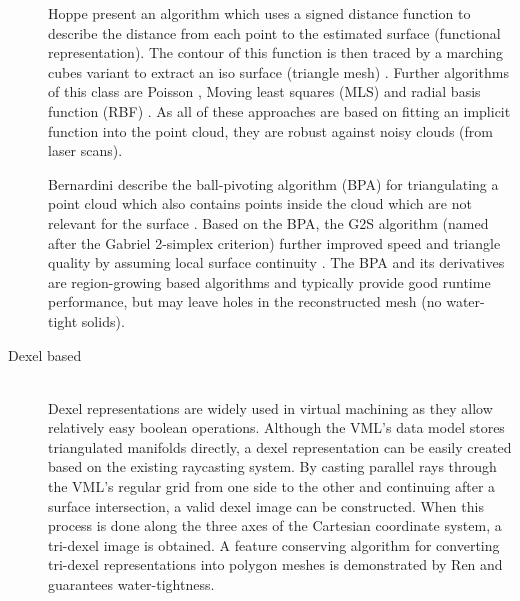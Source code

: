 \begin{description}
	Hoppe \etal present an algorithm which uses a signed distance function to describe the distance from each point to the estimated surface (functional representation).
	The contour of this function is then traced by a marching cubes variant to extract an iso surface (triangle mesh) \cite{sdf_surface_reconstruction}.
	Further algorithms of this class are Poisson \cite{poisson}, Moving least squares (MLS) \cite{mls} and radial basis function (RBF) \cite{rbf}.
	As all of these approaches are based on fitting an implicit function into the point cloud, they are robust against noisy clouds (\eg from laser scans).
	
	Bernardini \etal describe the ball-pivoting algorithm (BPA) for triangulating a point cloud which also contains points inside the cloud which are not relevant for the surface \cite{bpa}.
	Based on the BPA, the G2S algorithm (named after the Gabriel 2-simplex criterion) further improved speed and triangle quality by assuming local surface continuity \cite{g2s}.
	The BPA and its derivatives are region-growing based algorithms and typically provide good runtime performance, but may leave holes in the reconstructed mesh (no water-tight solids).
		
	\item[Dexel based] \hfill \\
	Dexel representations are widely used in virtual machining as they allow  relatively easy boolean operations.
	Although the VML's data model stores triangulated manifolds directly, a dexel representation can be easily created based on the existing raycasting system.
	By casting parallel rays through the VML's regular grid from one side to the other and continuing after a surface intersection, a valid dexel image can be constructed.
	When this process is done along the three axes of the Cartesian coordinate system, a tri-dexel image is obtained.
	A feature conserving algorithm for converting tri-dexel representations into polygon meshes is demonstrated by Ren \etal \cite{tridexel_reconstruction} and guarantees water-tightness.
	

\end{description}
